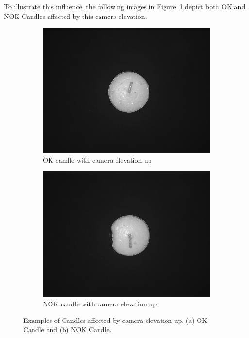 \documentclass[12pt,DIV14,BCOR12mm,a4paper,footinclude=false,headinclude,parskip=half-,twoside,openright,cleardoublepage=empty,toc=index,bibliography=totoc,listof=totoc]{scrreprt}
\numberwithin{equation}{chapter}
\begin{document}
\begin{enumerate}
	To illustrate this influence, the following images in Figure~\ref{fig:camera_elevation_up} depict both OK and NOK Candles affected by this camera elevation.

	\begin{figure}
		\centering
		\begin{subfigure}[b]{0.45\textwidth}
			\centering
			\includegraphics[scale=0.15]{../media/Candles-influence-camera-up-OK.png}
			\caption{OK candle with camera elevation up}
		\end{subfigure}
		\hfill
		\begin{subfigure}[b]{0.45\textwidth}
			\centering
			\includegraphics[scale=0.15]{../media/Candles-influence-camera-up-NOK.png}
			\caption{NOK candle with camera elevation up}
		\end{subfigure}
		\caption{Examples of Candles affected by camera elevation up. (a) OK Candle and (b) NOK Candle.}
		\label{fig:camera_elevation_up}
	\end{figure}
\end{enumerate}
\end{document}
